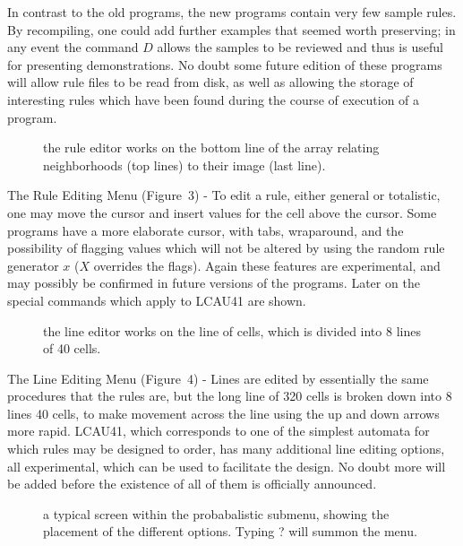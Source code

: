 \begin{list}{}{}
In contrast to the old programs, the new programs contain very few 
sample rules. By recompiling, one could add further examples that 
seemed worth preserving; in any event the command $D$ allows the 
samples to be reviewed and thus is useful for presenting demonstrations. 
No doubt some future edition of these programs will allow rule files to 
be read from disk, as well as allowing the storage of interesting rules 
which have been found during the course of execution of a program. 

\begin{figure}[ht]
\centering
\fbox{\rule{0mm}{20mm}\rule{120mm}{0mm}} 
\caption{the rule editor works on the bottom line of the array 
relating neighborhoods (top lines) to their image (last line).} 
\end{figure} 

\item[The Rule Editing Menu (Figure~3)] - To edit a rule, either 
general or totalistic, one may move the cursor and insert values for 
the cell above the cursor. Some programs have a more elaborate cursor, 
with tabs, wraparound, and the possibility of flagging values which 
will not be altered by using the random rule generator $x$ ($X$ overrides 
the flags). Again these features are experimental, and may possibly be 
confirmed in future versions of the programs. Later on the special 
commands which apply to LCAU41 are shown. 

\begin{figure}[ht]
\centering
\fbox{\rule{0mm}{35mm}\rule{120mm}{0mm}} 
\caption{the line editor works on the line of cells, which is divided 
into 8 lines of 40 cells.} 
\end{figure} 

\item[The Line Editing Menu (Figure~4)] - Lines are edited by 
essentially the same procedures that the rules are, but the long line 
of 320 cells is broken down into 8 lines 40 cells, to make movement 
across the line using the up and down arrows more rapid. LCAU41, which 
corresponds to one of the simplest automata for which rules may be 
designed to order, has many additional line editing options, all 
experimental, which can be used to facilitate the design. No doubt more 
will be added before the existence of all of them is officially 
announced. 

\begin{figure}[htp]
\centering
\fbox{\rule{0mm}{85mm}\rule{124mm}{0mm}} 
\caption{a typical screen within the probabalistic submenu, showing the 
placement of the different options. Typing ? will summon the menu.} 
\end{figure} 


\end{list}
